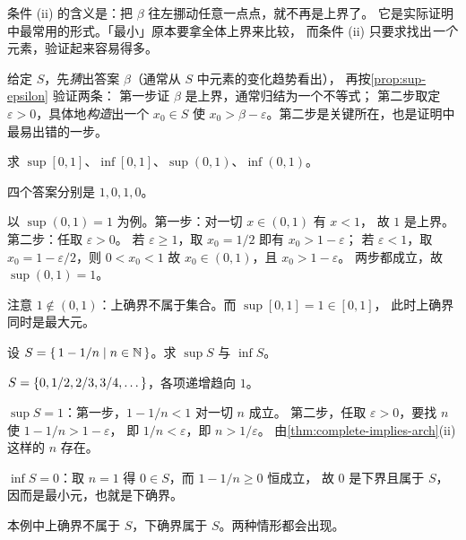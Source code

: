 \begin{intuition}
  条件 (ii) 的含义是：把 \(\beta\) 往左挪动任意一点点，就不再是上界了。
  它是实际证明中最常用的形式。「最小」原本要拿全体上界来比较，
  而条件 (ii) 只要求找出\emph{一个}元素，验证起来容易得多。
\end{intuition}

\begin{strategy}[求上确界的标准两步]
  给定 \(S\)，先\emph{猜}出答案 \(\beta\)（通常从 \(S\) 中元素的变化趋势看出），
  再按\cref{prop:sup-epsilon} 验证两条：
  第一步证 \(\beta\) 是上界，通常归结为一个不等式；
  第二步取定 \(\varepsilon > 0\)，具体地\emph{构造}出一个 \(x_{0} \in S\)
  使 \(x_{0} > \beta - \varepsilon\)。第二步是关键所在，也是证明中最易出错的一步。
\end{strategy}

\begin{example}[闭区间与开区间]
  \label{ex:sup-intervals}
  求 \(\sup[0,1]\)、\(\inf[0,1]\)、\(\sup(0,1)\)、\(\inf(0,1)\)。
  \begin{worked}
    四个答案分别是 \(1, 0, 1, 0\)。

    以 \(\sup(0,1) = 1\) 为例。第一步：对一切 \(x \in (0,1)\) 有 \(x < 1\)，
    故 \(1\) 是上界。第二步：任取 \(\varepsilon > 0\)。
    若 \(\varepsilon \ge 1\)，取 \(x_{0} = 1/2\) 即有 \(x_{0} > 1 - \varepsilon\)；
    若 \(\varepsilon < 1\)，取 \(x_{0} = 1 - \varepsilon/2\)，则
    \(0 < x_{0} < 1\) 故 \(x_{0} \in (0,1)\)，且 \(x_{0} > 1 - \varepsilon\)。
    两步都成立，故 \(\sup(0,1) = 1\)。

    注意 \(1 \notin (0,1)\)：上确界不属于集合。而 \(\sup[0,1] = 1 \in [0,1]\)，
    此时上确界同时是最大元。
  \end{worked}
\end{example}

\begin{example}[由数列给出的集合]
  \label{ex:sup-sequence}
  设 \(S = \left\{\,1 - 1/n \;\middle|\; n \in \mathbb{N}\,\right\}\)。求 \(\sup S\) 与 \(\inf S\)。
  \begin{worked}
    \(S = \left\{0, 1/2, 2/3, 3/4, \dots\right\}\)，各项递增趋向 \(1\)。

    \(\sup S = 1\)：第一步，\(1 - 1/n < 1\) 对一切 \(n\) 成立。
    第二步，任取 \(\varepsilon > 0\)，要找 \(n\) 使 \(1 - 1/n > 1 - \varepsilon\)，
    即 \(1/n < \varepsilon\)，即 \(n > 1/\varepsilon\)。
    由\cref{thm:complete-implies-arch}(ii) 这样的 \(n\) 存在。

    \(\inf S = 0\)：取 \(n = 1\) 得 \(0 \in S\)，而 \(1 - 1/n \ge 0\) 恒成立，
    故 \(0\) 是下界且属于 \(S\)，因而是最小元，也就是下确界。

    本例中上确界不属于 \(S\)，下确界属于 \(S\)。两种情形都会出现。
  \end{worked}
\end{example}

